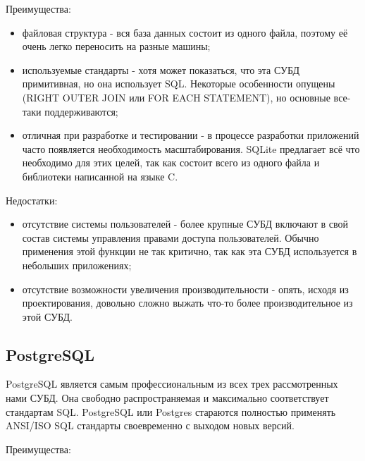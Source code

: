 \hspace{0cm} Преимущества:

\begin{itemize}
  \item файловая структура - вся база данных состоит из одного файла, поэтому её очень легко переносить на разные машины;
  \item используемые стандарты - хотя может показаться, что эта СУБД примитивная, но она использует SQL. Некоторые особенности опущены (RIGHT OUTER JOIN или FOR EACH STATEMENT), но основные все-таки поддерживаются;
  \item отличная при разработке и тестировании - в процессе разработки приложений часто появляется необходимость масштабирования. SQLite предлагает всё что необходимо для этих целей, так как состоит всего из одного файла и библиотеки написанной на языке C.
\end{itemize}

\hspace{0cm} Недостатки:

\begin{itemize}
  \item отсутствие системы пользователей - более крупные СУБД включают в свой состав системы управления правами доступа пользователей. Обычно применения этой функции не так критично, так как эта СУБД используется в небольших приложениях;
  \item отсутствие возможности увеличения производительности - опять, исходя из проектирования, довольно сложно выжать что-то более производительное из этой СУБД.
\end{itemize}

\subsection{PostgreSQL}

\hspace{0cm} PostgreSQL является самым профессиональным из всех трех рассмотренных нами СУБД. Она свободно распространяемая и максимально соответствует стандартам SQL. PostgreSQL или Postgres стараются полностью применять ANSI/ISO SQL стандарты своевременно с выходом новых версий\cite{web:PostgreSQL}.

\hspace{0cm} Преимущества:

